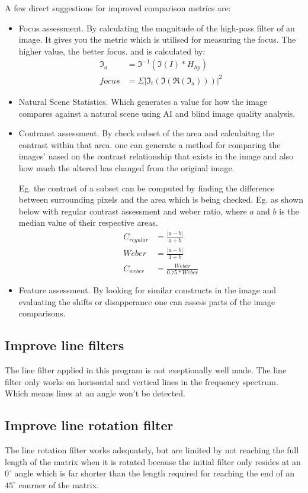 A few direct suggestions for improved comparison metrics are:
\begin{itemize}
	\item Focus assessment.  By calculating the magnitude of the high-pass filter
		of an image. It gives you the metric which is utilised for measuring the
		focus.  The higher value, the better focus. and is calculated by:
		\begin{align}
			\Im_a &= \Im^{-1}(\Im(I) * H_{hp}) \\
			focus &= \Sigma | \Im_t( \Im( \Re(\Im_a) ) )|^2
		\end{align}

	\item Natural Scene Statistics.  Which generates a value for how the image
		compares against a natural scene using AI and blind image quality analysis.

	\item Contranst assessment.  By check subset of the area and calculaitng the
		contrast within that area. one can generate a method for comparing the
		images' nased on the contrast relationship that exists in the image and also
		how much the altered has changed from the original image.

		Eg. the contrast of a subset can be computed by finding the difference
		between surrounding pixels and the area which is being checked. Eg. as shown
		below with regular contrast assessment and weber ratio, where $a$ and $b$ is
		the median value of their respective areas.
		\begin{align}
			C_{regular} &= \frac{|a-b|}{a+b} 		\\
			Weber			&= \frac{|a-b|}{1+b} 			\\
			C_{weber} &= \frac{Weber}{0.75*Weber }
		\end{align}

	\item Feature assessment. By looking for similar constructs in the image and
		evaluating the shifts or disapperance one can assess parts of the image
		comparisons.
\end{itemize}



\subsection{Improve line filters}
	The line filter applied in this program is not exeptionally well made. The
	line filter only works on horisontal and vertical lines in the frequency
	spectrum.  Which means lines at an angle won't be detected.

\subsection{Improve line rotation filter}
	The line rotation filter works adequately, but are limited by not reaching the
full length of the matrix when it is rotated because the initial filter only
resides at an $0^\circ$ angle which is far shorter than the length required for
reaching the end of an $45^\circ$ conrner of the matrix.


